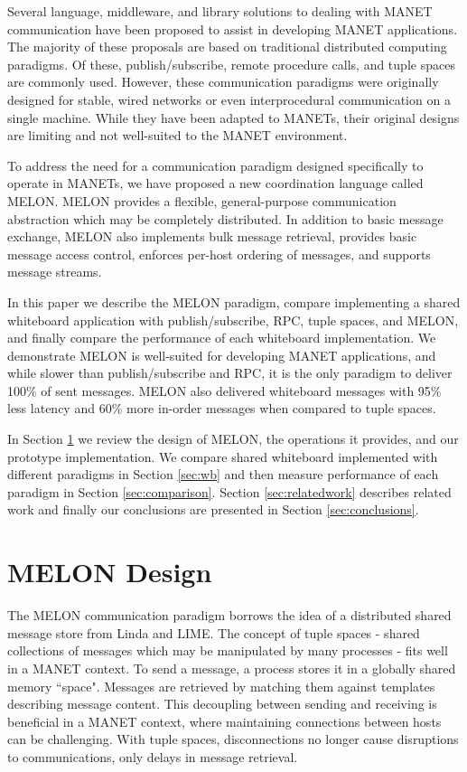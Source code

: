 \documentclass{llncs}
\begin{document}
Several language, middleware, and library solutions to dealing with MANET communication have been proposed to assist in developing MANET applications. The majority of these proposals are based on traditional distributed computing paradigms\cite{mine}. Of these, publish/subscribe, remote procedure calls, and tuple spaces are commonly used. However, these communication paradigms were originally designed for stable, wired networks or even interprocedural communication on a single machine. While they have been adapted to MANETs, their original designs are limiting and not well-suited to the MANET environment\cite{collins2010quantitative}.

To address the need for a communication paradigm designed specifically to operate in MANETs, we have proposed a new coordination language called MELON\cite{melon}. MELON provides a flexible, general-purpose communication abstraction which may be completely distributed. In addition to basic message exchange, MELON also implements bulk message retrieval, provides basic message access control, enforces per-host ordering of messages, and supports message streams.

In this paper we describe the MELON paradigm, compare implementing a shared whiteboard application with publish/subscribe, RPC, tuple spaces, and MELON, and finally compare the performance of each whiteboard implementation. We demonstrate MELON is well-suited for developing MANET applications, and while slower than publish/subscribe and RPC, it is the only paradigm to deliver 100\% of sent messages. MELON also delivered whiteboard messages with 95\% less latency and 60\% more in-order messages when compared to tuple spaces.

In Section \ref{sec:design} we review the design of MELON, the operations it provides, and our prototype implementation. We compare shared whiteboard implemented with different paradigms in Section \ref{sec:wb} and then measure performance of each paradigm in Section \ref{sec:comparison}. Section \ref{sec:relatedwork} describes related work and finally our conclusions are presented in Section \ref{sec:conclusions}.

\section{MELON Design}\label{sec:design}

The MELON communication paradigm borrows the idea of a distributed shared message store from Linda\cite{linda} and LIME\cite{lime}. The concept of tuple spaces - shared collections of messages which may be manipulated by many processes - fits well in a MANET context. To send a message, a process stores it in a globally shared memory ``space". Messages are retrieved by matching them against templates describing message content. This decoupling between sending and receiving is beneficial in a MANET context, where maintaining connections between hosts can be challenging. With tuple spaces, disconnections no longer cause disruptions to communications, only delays in message retrieval.
\end{document}
